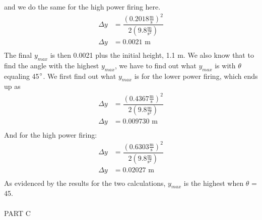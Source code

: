 \documentclass [12pt, letterpaper, twoside] {article}
\begin{document}
\noindent
and we do the same for the high power firing here.
\begin {equation}
  \begin {split}
    \Delta{y} & = \dfrac{(0.2018\tfrac{\text{m}}{\text{s}})^2}{2(9.8\tfrac{\text{m}}{\text{s}^2})}\\ 
    \Delta{y} & = 0.0021\text{ m} \\
  \end {split}
\end {equation}
The final \(y_{max}\) is then 0.0021 plus the initial height, 1.1 m. We also know that to find the angle with the highest \(y_{max}\), we have to find out what \(y_{max}\) is with \(\theta\) equaling 45\(\degree\). We first find out what \(y_{max}\) is for the lower power firing, which ends up as
\begin {equation}
   \begin {split}
     \Delta{y} & = \dfrac{(0.4367\tfrac{\text{m}}{\text{s}})^2}{2(9.8\tfrac{\text{m}}{\text{s}^2})}\\
     \Delta{y} & = 0.009730 \text{ m} \\
   \end {split}
 \end {equation}
And for the high power firing:
\begin {equation}
   \begin {split}
     \Delta{y} & = \dfrac{(0.6303\tfrac{\text{m}}{\text{s}})^2}{2(9.8\tfrac{\text{m}}{\text{s}^2})}\\
     \Delta{y} & = 0.02027 \text{ m} \\
   \end {split}
 \end {equation}
 As evidenced by the results for the two calculations, \(y_{max}\) is the highest when \(\theta\) = 45\degree. \\\\

\noindent
PART C

\begin {center}
\end {center}
\end{document}
